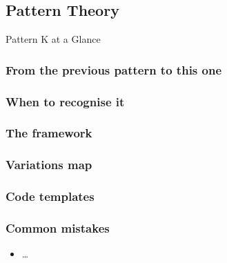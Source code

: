 \subsection{Pattern Theory}
\label{ssec:chN-pK-theory}

\begin{patternbox}{Pattern K at a Glance}
\end{patternbox}

\subsubsection*{From the previous pattern to this one}

\subsubsection*{When to recognise it}

\subsubsection*{The framework}

\subsubsection*{Variations map}

\subsubsection*{Code templates}

\subsubsection*{Common mistakes}

\begin{checklistbox}
\begin{itemize}[leftmargin=*]
    \item[$\square$] \ldots
\end{itemize}
\end{checklistbox}
